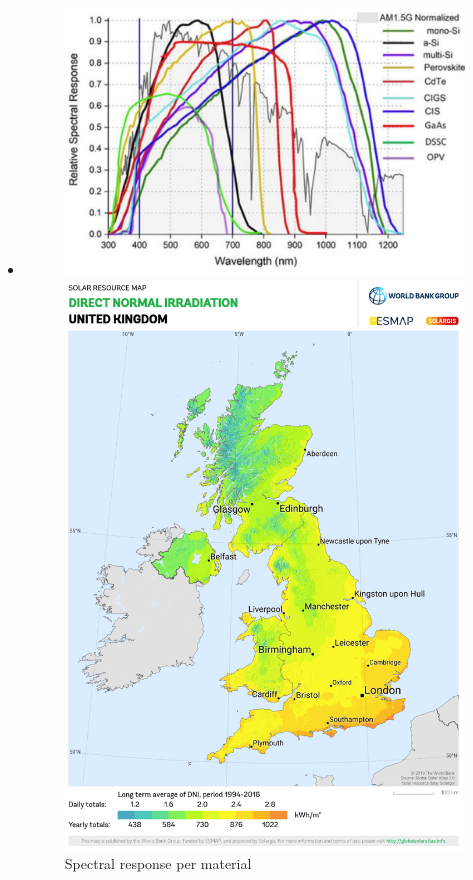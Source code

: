 \begin{frame}[c]{}
\begin{itemize}
        \item<only@2>[]
            \begin{figure}
                \centering
                \begin{minipage}{0.6\linewidth}
                    \includegraphics[width=\linewidth]{Figures/Material_response.png}
                    \caption{Spectral response per material}
                \end{minipage}%
                \begin{minipage}{0.4\linewidth}
                    \includegraphics[width=\linewidth]{Figures/Irradiance distribution.png}

\end{minipage}
\end{figure}
\end{itemize}
\end{frame}
